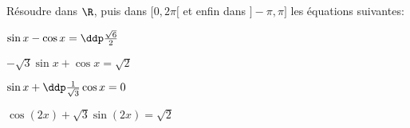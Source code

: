 
\begin{exercice}  \;
R\'esoudre dans $\R$, puis dans $\lbrack 0,2\pi\lbrack$ et enfin dans $\rbrack -\pi,\pi\rbrack$ les \'equations suivantes:\\
\begin{enumerate}
\noindent \begin{minipage}[t]{0.45\textwidth}
\item $\sin{x}-\cos{x}=\ddp\frac{\sqrt{6}}{2}$
\item $-\sqrt{3}\sin{x}+\cos{x}=\sqrt{2}$
\end{minipage}
\begin{minipage}[t]{0.45\textwidth}
\item $\sin{x}+\ddp\frac{1}{\sqrt{3}}\cos{x}=0$
\item $\cos{(2x)}+\sqrt{3}\sin{(2x)}=\sqrt{2}$
\end{minipage}
\end{enumerate}
\end{exercice}